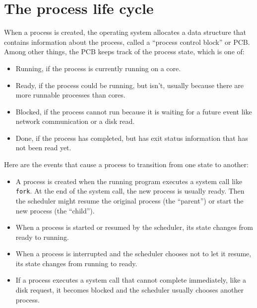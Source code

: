 \documentclass[12pt]{book}
\begin{document}
{\section{The process life cycle}

When a process is created, the operating system allocates a
data structure that contains information about the process, called
a ``process control block'' or PCB.  Among other things, the
PCB keeps track of the process state, which is one of:

\begin{itemize}

\item Running, if the process is currently running on a core.

\item Ready, if the process could be running, but isn't, usually because
there are more runnable processes than cores.

\item Blocked, if the process cannot run because it is waiting for
a future event like network communication or a disk read.

\item Done, if the process has completed, but has exit status
information that has not been read yet.

\end{itemize}

Here are the events that cause a process to transition from one state to another:

\begin{itemize}

\item A process is created when the running program executes a system
  call like {\tt fork}.  At the end of the system call, the new
  process is usually ready.  Then the scheduler might resume the
  original process (the ``parent'') or start the new process (the
  ``child'').

\item When a process is started or resumed by the scheduler, its state
  changes from ready to running.

\item When a process is interrupted and the scheduler chooses not
  to let it resume, its state changes from running to ready.

\item If a process executes a system call that cannot complete
  immediately, like a disk request, it becomes blocked
  and the scheduler usually chooses another process.


\end{itemize}}
\end{document}

